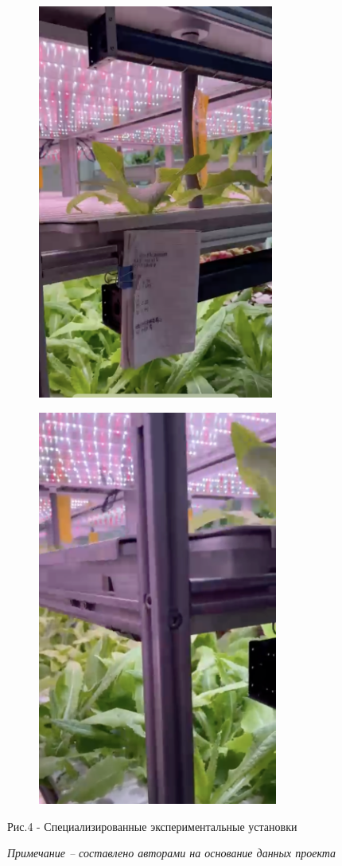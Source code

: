 \begin{figure}[H]
    \centering
    \begin{subfigure}[t]{0.45\textwidth}
        \centering
        \includegraphics[height=13cm]{media/ekon2/image49}
    \end{subfigure}
    \begin{subfigure}[t]{0.45\textwidth}
        \centering
        \includegraphics[height=13cm]{media/ekon2/image50}
    \end{subfigure}
    \caption*{Рис.4 - Специализированные экспериментальные установки}
    \caption*{\normalfont\emph{Примечание -- составлено авторами на основание данных проекта}}
\end{figure}

